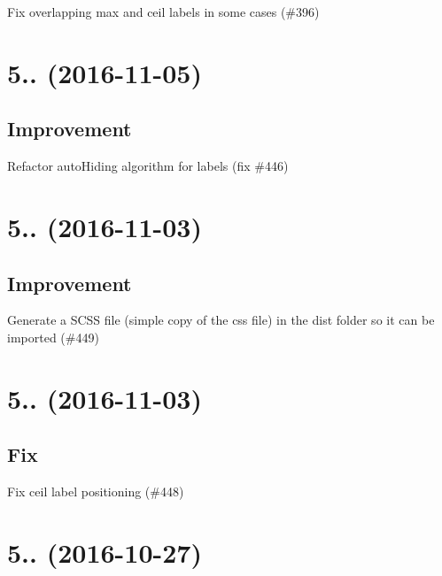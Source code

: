 \begin{DoxyItemize}
\item Fix overlapping max and ceil labels in some cases (\#396)
\end{DoxyItemize}

\section*{5.. (2016-\/11-\/05)}

\subsection*{Improvement}


\begin{DoxyItemize}
\item Refactor auto\+Hiding algorithm for labels (fix \#446)
\end{DoxyItemize}

\section*{5.. (2016-\/11-\/03)}

\subsection*{Improvement}


\begin{DoxyItemize}
\item Generate a S\+C\+SS file (simple copy of the css file) in the dist folder so it can be imported (\#449)
\end{DoxyItemize}

\section*{5.. (2016-\/11-\/03)}

\subsection*{Fix}


\begin{DoxyItemize}
\item Fix ceil label positioning (\#448)
\end{DoxyItemize}

\section*{5.. (2016-\/10-\/27)}

